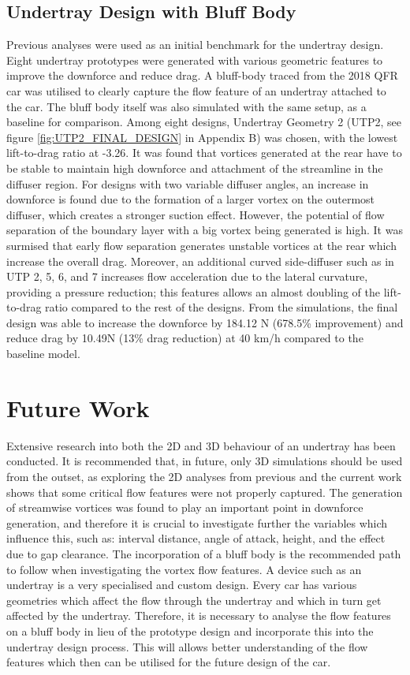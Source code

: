 \subsection{Undertray Design with Bluff Body}
Previous analyses were used as an initial benchmark for the undertray design. Eight undertray prototypes were generated with various geometric features to improve the downforce and reduce drag. A bluff-body traced from the 2018 QFR car was utilised to clearly capture the flow feature of an undertray attached to the car. The bluff body itself was also simulated with the same setup, as a baseline for comparison. Among eight designs, Undertray Geometry 2 (UTP2, see figure \ref{fig:UTP2_FINAL_DESIGN} in Appendix B) was chosen, with the lowest lift-to-drag ratio at -3.26. It was found that vortices generated at the rear have to be stable to maintain high downforce and attachment of the streamline in the diffuser region. For designs with two variable diffuser angles, an increase in downforce is found due to the formation of a larger vortex on the outermost diffuser, which creates a stronger suction effect. However, the potential of flow separation of the boundary layer with a big vortex being generated is high. It was surmised that early flow separation generates unstable vortices at the rear which increase the overall drag. Moreover, an additional curved side-diffuser such as in UTP 2, 5, 6, and 7 increases flow acceleration due to the lateral curvature, providing a pressure reduction; this features allows an almost doubling of the lift-to-drag ratio compared to the rest of the designs. From the simulations, the final design was able to increase the downforce by 184.12 N (678.5\% improvement) and reduce drag by 10.49N (13\% drag reduction) at 40 km/h compared to the baseline model.


\section{Future Work}
\noindent Extensive research into both the 2D and 3D behaviour of an undertray has been conducted. It is recommended that, in future, only 3D simulations should be used from the outset, as exploring the 2D analyses from previous and the current work shows that some critical flow features were not properly captured. The generation of streamwise vortices was found to play an important point in downforce generation, and therefore it is crucial to investigate further the variables which influence this, such as: interval distance, angle of attack, height, and the effect due to gap clearance. The incorporation of a bluff body is the recommended path to follow when investigating the vortex flow features. A device such as an undertray is a very specialised and custom design. Every car has various geometries which affect the flow through the undertray and which in turn get affected by the undertray. Therefore, it is necessary to analyse the flow features on a bluff body in lieu of the prototype design and incorporate this into the undertray design process. This will allows better understanding of the flow features which then can be utilised for the future design of the car.


